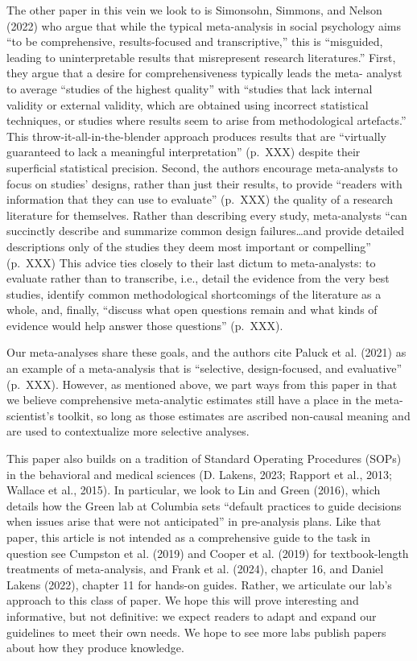 \documentclass[
  ,jou]{apa6}
\begin{document}
The other paper in this vein we look to is Simonsohn, Simmons, and Nelson (2022) who argue that while the typical meta-analysis in social psychology aims ``to be comprehensive, results-focused and transcriptive,'' this is ``misguided, leading to uninterpretable results that misrepresent research literatures.'' First, they argue that a desire for comprehensiveness typically leads the meta- analyst to average ``studies of the highest quality'' with ``studies that lack internal validity or external validity, which are obtained using incorrect statistical techniques, or studies where results seem to arise from methodological artefacts.'' This throw-it-all-in-the-blender approach produces results that are ``virtually guaranteed to lack a meaningful interpretation'' (p.~XXX) despite their superficial statistical precision. Second, the authors encourage meta-analysts to focus on studies' designs, rather than just their results, to provide ``readers with information that they can use to evaluate'' (p.~XXX) the quality of a research literature for themselves. Rather than describing every study, meta-analysts ``can succinctly describe and summarize common design failures\ldots and provide detailed descriptions only of the studies they deem most important or compelling'' (p.~XXX) This advice ties closely to their last dictum to meta-analysts: to evaluate rather than to transcribe, i.e., detail the evidence from the very best studies, identify common methodological shortcomings of the literature as a whole, and, finally, ``discuss what open questions remain and what kinds of evidence would help answer those questions'' (p.~XXX).

Our meta-analyses share these goals, and the authors cite Paluck et al. (2021) as an example of a meta-analysis that is ``selective, design-focused, and evaluative'' (p.~XXX). However, as mentioned above, we part ways from this paper in that we believe comprehensive meta-analytic estimates still have a place in the meta-scientist's toolkit, so long as those estimates are ascribed non-causal meaning and are used to contextualize more selective analyses.

This paper also builds on a tradition of Standard Operating Procedures (SOPs) in the behavioral and medical sciences (D. Lakens, 2023; Rapport et al., 2013; Wallace et al., 2015). In particular, we look to Lin and Green (2016), which details how the Green lab at Columbia sets ``default practices to guide decisions when issues arise that were not anticipated'' in pre-analysis plans. Like that paper, this article is not intended as a comprehensive guide to the task in question \textemdash see Cumpston et al. (2019) and Cooper et al. (2019) for textbook-length treatments of meta-analysis, and Frank et al. (2024), chapter 16, and Daniel Lakens (2022), chapter 11 for hands-on guides. Rather, we articulate our lab's approach to this class of paper. We hope this will prove interesting and informative, but not definitive: we expect readers to adapt and expand our guidelines to meet their own needs. We hope to see more labs publish papers about how they produce knowledge.
\end{document}
